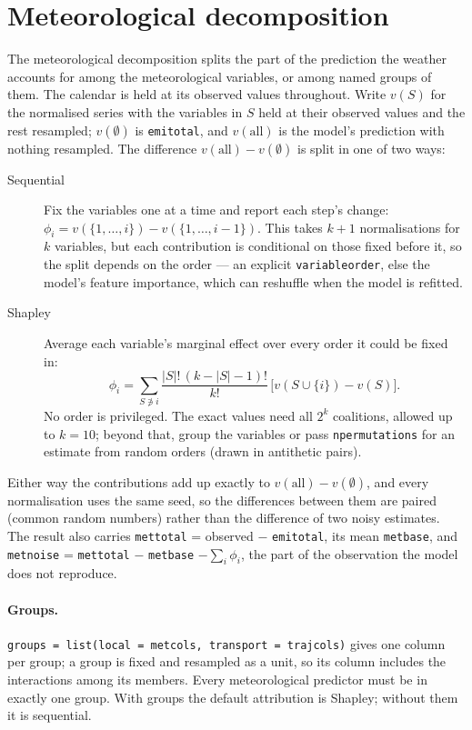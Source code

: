 \documentclass[11pt]{report}
\newcommand{\codeunderscore}{\textunderscore\allowbreak}
\newcommand{\code}[1]{\texttt{\let\_\codeunderscore #1}}
\begin{document}
\section{Meteorological decomposition}\label{sec:metdecomp}
The meteorological decomposition splits the part of the prediction the weather accounts
for among the meteorological variables, or among named groups of them. The calendar is
held at its observed values throughout. Write $v(S)$ for the normalised series with the
variables in $S$ held at their observed values and the rest resampled; $v(\emptyset)$ is
\code{emi\_total}, and $v(\text{all})$ is the model's prediction with nothing resampled.
The difference $v(\text{all}) - v(\emptyset)$ is split in one of two ways:
\begin{description}
  \item[Sequential] Fix the variables one at a time and report each step's change:
        $\phi_i = v(\{1,\dots,i\}) - v(\{1,\dots,i-1\})$. This takes $k+1$
        normalisations for $k$ variables, but each contribution is conditional on those
        fixed before it, so the split depends on the order --- an explicit
        \code{variable\_order}, else the model's feature importance, which can reshuffle
        when the model is refitted.
  \item[Shapley] Average each variable's marginal effect over every order it could be
        fixed in:
        \begin{equation}
          \phi_i = \sum_{S \not\ni i} \frac{|S|!\,(k-|S|-1)!}{k!}\,
                   \bigl[v(S\cup\{i\}) - v(S)\bigr].
        \end{equation}
        No order is privileged. The exact values need all $2^k$ coalitions, allowed up
        to $k=10$; beyond that, group the variables or pass \code{n\_permutations} for
        an estimate from random orders (drawn in antithetic pairs).
\end{description}
Either way the contributions add up exactly to $v(\text{all}) - v(\emptyset)$, and every
normalisation uses the same seed, so the differences between them are paired (common
random numbers) rather than the difference of two noisy estimates. The result also
carries \code{met\_total} = observed $-$ \code{emi\_total}, its mean \code{met\_base},
and \code{met\_noise} = \code{met\_total} $-$ \code{met\_base} $-\sum_i\phi_i$, the part
of the observation the model does not reproduce.

\paragraph{Groups.} \code{groups = list(local = met\_cols, transport = traj\_cols)} gives one
column per group; a group is fixed and resampled as a unit, so its column includes the
interactions among its members. Every meteorological predictor must be in exactly one
group. With groups the default attribution is Shapley; without them it is sequential.
\end{document}
